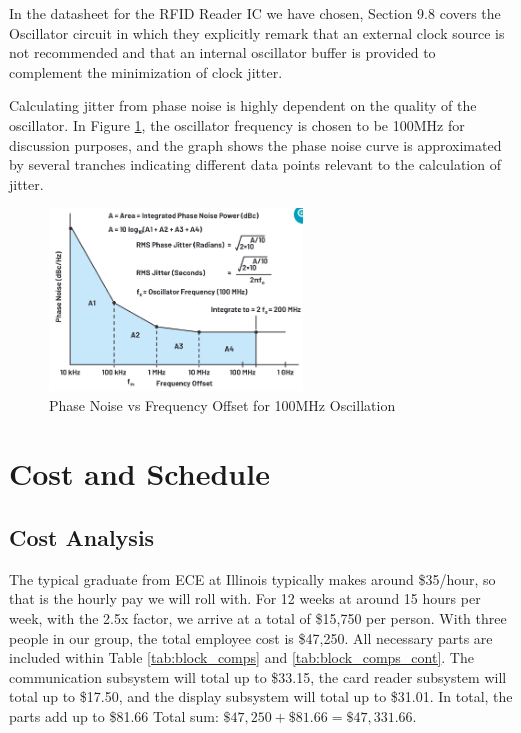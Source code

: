 \documentclass[12pt]{article}
\begin{document}
In the datasheet for the RFID Reader IC we have chosen, Section 9.8 covers the Oscillator circuit in which they explicitly remark that an external clock source is not recommended and that an internal oscillator buffer is provided to complement the minimization of clock jitter. 

Calculating jitter from phase noise is highly dependent on the quality of the oscillator. In Figure \ref{fig:noise}, the oscillator frequency is chosen to be 100MHz for discussion purposes, and the graph shows the phase noise curve is approximated by several tranches indicating different data points relevant to the calculation of jitter.

\begin{figure}[!h]
	\centering
	\includegraphics[width=0.6\textwidth]{image4.png}
	\caption{Phase Noise vs Frequency Offset for 100MHz Oscillation}
	\label{fig:noise}
\end{figure}

\section{Cost and Schedule}

\subsection{Cost Analysis}

The typical graduate from ECE at Illinois typically makes around \$35/hour, so that is the hourly pay we will roll with. For 12 weeks at around 15 hours per week, with the 2.5x factor, we arrive at a total of \$15,750 per person. With three people in our group, the total employee cost is \$47,250. All necessary parts are included within Table \ref{tab:block_comps} and \ref{tab:block_comps_cont}. The communication subsystem will total up to \$33.15, the card reader subsystem will total up to \$17.50, and the display subsystem will total up to \$31.01. In total, the parts add up to \$81.66
Total sum: $\$47,250+\$81.66 = \$47,331.66$.
\end{document}
